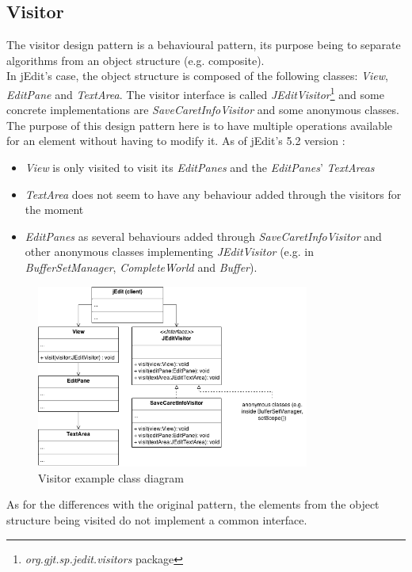\subsection{Visitor}
The visitor design pattern is a behavioural pattern, its purpose being to
separate algorithms from an object structure (e.g. composite).\\

In jEdit's case, the object structure is composed of the following classes:
\emph{View}, \emph{EditPane} and \emph{TextArea}.
The visitor interface is called
\emph{JEditVisitor}\footnote{\emph{org.gjt.sp.jedit.visitors} package} and some
concrete implementations are \emph{SaveCaretInfoVisitor} and some anonymous
classes. The purpose of this design pattern here is to have multiple operations
available for an element without having to modify it. As of jEdit's 5.2 version :

\begin{itemize}\itemsep1pt
    \item  \emph{View} is only visited to visit its \emph{EditPanes} and the
    \emph{EditPanes}' \emph{TextAreas}
    \item \emph{TextArea} does not seem to have any behaviour added through the visitors for the moment
    \item \emph{EditPanes} as several behaviours added through
    \emph{SaveCaretInfoVisitor} and other anonymous classes implementing
    \emph{JEditVisitor} (e.g. in \emph{BufferSetManager}, \emph{CompleteWorld}
    and \emph{Buffer}).
\end{itemize}

\begin{figure}[h!]
    \includegraphics[width=0.8\textwidth]{images/visitor.png}
    \centering
    \caption{Visitor example class diagram}
\end{figure}

As for the differences with the original pattern, the elements from the object structure being visited do not implement a common interface.
\newpage
